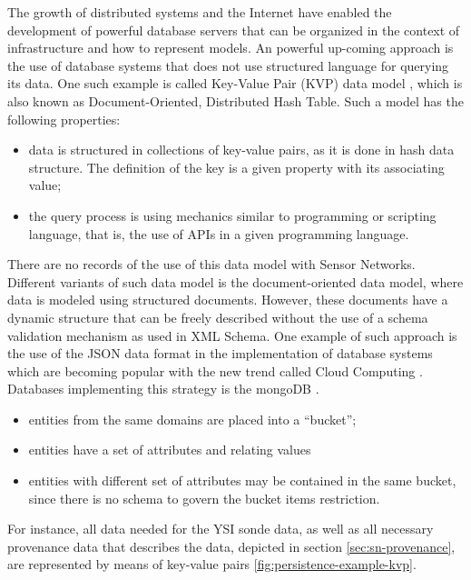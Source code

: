 The growth of distributed systems and the Internet have enabled the development
of powerful database servers that can be organized in the context of
infrastructure and how to represent models. An powerful up-coming approach is
the use of database systems that does not use structured language for querying
its data. One such example is called Key-Value Pair (KVP) data model
\cite{db-kvp}, which is also known as Document-Oriented, Distributed Hash
Table. Such a model has the following properties:

\begin{itemize}
  \item data is structured in collections of key-value pairs, as it is done in
  hash data structure. The definition of the key is a given property with its
  associating value;
  \item the query process is using mechanics similar to programming or
  scripting language, that is, the use of APIs in a given programming language.
\end{itemize}

There are no records of the use of this data model with Sensor Networks.
Different variants of such data model is the document-oriented data model,
where data is modeled using structured documents. However, these documents
have a dynamic structure that can be freely described without the use of a
schema validation mechanism as used in XML Schema. One example of such
approach is the use of the JSON data format \cite{json} in the implementation
of database systems which are becoming popular with the new trend called Cloud
Computing \cite{cloud-comp-architectures}. Databases implementing this
strategy is the mongoDB \cite{mongodb}.

\begin{itemize}
  \item entities from the same domains are placed into a ``bucket'';
  \item entities have a set of attributes and relating values
  \item entities with different set of attributes may be contained in the same
  bucket, since there is no schema to govern the bucket items restriction.
\end{itemize}

For instance, all data needed for the YSI sonde data, as well as all necessary
provenance data that describes the data, depicted in section
\ref{sec:sn-provenance}, are represented by means of key-value pairs
\ref{fig:persistence-example-kvp}.


